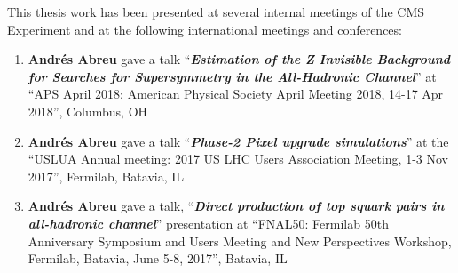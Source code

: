 This thesis work has been presented at several internal meetings of the CMS Experiment and at the following international meetings and conferences:

\begin{enumerate}
	\item{\textbf{Andr\'es Abreu} gave a talk ``\textbf{\textit{Estimation of the Z Invisible Background for Searches for Supersymmetry in the All-Hadronic Channel}}'' at ``APS April 2018: American Physical Society April Meeting 2018, 14-17 Apr 2018'', Columbus, OH}
	\item{\textbf{Andr\'es Abreu} gave a talk ``\textbf{\textit{Phase-2 Pixel upgrade simulations}}'' at the ``USLUA Annual meeting: 2017 US LHC Users Association Meeting, 1-3 Nov 2017'', Fermilab, Batavia, IL}
	\item{\textbf{Andr\'es Abreu} gave a talk, ``\textbf{\textit{Direct production of top squark pairs in all-hadronic channel}}'' presentation at  ``FNAL50: Fermilab 50th Anniversary Symposium and Users Meeting and New Perspectives  Workshop, Fermilab, Batavia, June 5-8, 2017'', Batavia, IL}
\end{enumerate}


